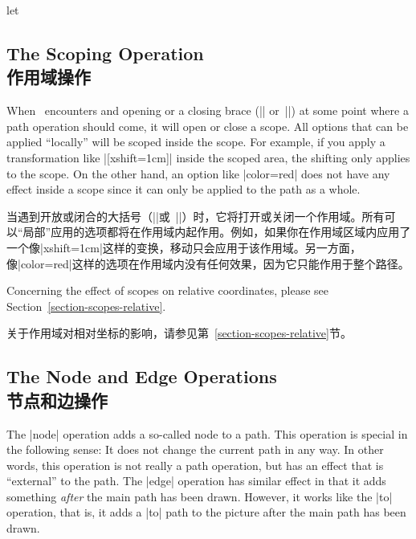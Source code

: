 \begin{pathoperation}{let}{
        }
\begin{codeexample}[pre={\pgfmathsetseed{1}},preamble={\usetikzlibrary{calc}}]
\end{codeexample}
\end{pathoperation}


\subsection{The Scoping Operation\\作用域操作}

When \tikzname\ encounters and opening or a closing brace (|{| or~|}|) at some
point where a path operation should come, it will open or close a scope. All
options that can be applied ``locally'' will be scoped inside the scope. For
example, if you apply a transformation like |[xshift=1cm]| inside the scoped
area, the shifting only applies to the scope. On the other hand, an option like
|color=red| does not have any effect inside a scope since it can only be
applied to the path as a whole.

当\tikzname 遇到开放或闭合的大括号（|{|或~|}|）时，它将打开或关闭一个作用域。所有可以“局部”应用的选项都将在作用域内起作用。例如，如果你在作用域区域内应用了一个像|xshift=1cm|这样的变换，移动只会应用于该作用域。另一方面，像|color=red|这样的选项在作用域内没有任何效果，因为它只能作用于整个路径。

Concerning the effect of scopes on relative coordinates, please see
Section~\ref{section-scopes-relative}.

关于作用域对相对坐标的影响，请参见第~\ref{section-scopes-relative}节。


\subsection{The Node and Edge Operations\\节点和边操作}

The |node| operation adds a so-called node to a path. This operation is special
in the following sense: It does not change the current path in any way. In
other words, this operation is not really a path operation, but has an effect
that is ``external'' to the path. The |edge| operation has similar effect in
that it adds something \emph{after} the main path has been drawn. However, it
works like the |to| operation, that is, it adds a |to| path to the picture
after the main path has been drawn.

